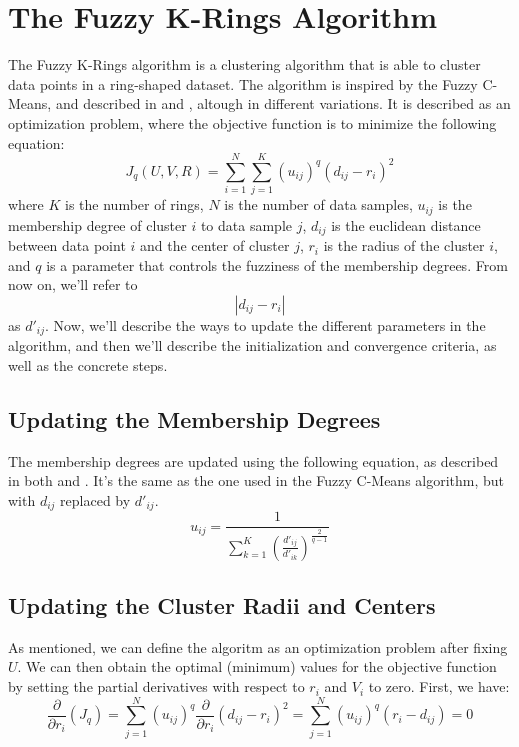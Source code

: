 \documentclass[conference]{IEEEtran}
\begin{document}
\section{The Fuzzy K-Rings Algorithm}
The Fuzzy K-Rings algorithm is a clustering algorithm that is able to cluster data points in a ring-shaped dataset.
The algorithm is inspired by the Fuzzy C-Means, and described in \cite{DAVE1992713} and \cite{308484}, altough in different variations.
It is described as an optimization problem, where the objective function is to minimize the following equation:
\begin{equation}\label{eq:objective}
J_q(U, V, R) = \sum_{i=1}^{N} \sum_{j=1}^{K} (u_{ij})^q (d_{ij} - r_i)^2
\end{equation}
where $K$ is the number of rings, $N$ is the number of data samples, $u_{ij}$ is the membership degree of cluster $i$ to data sample $j$, $d_{ij}$ is the euclidean distance between data point $i$ and the center of cluster $j$, $r_i$ is the radius of the cluster $i$, and $q$ is a parameter that controls the fuzziness of the membership degrees.
From now on, we'll refer to $$|d_{ij} - r_i|$$ as $d'_{ij}$.
Now, we'll describe the ways to update the different parameters in the algorithm, and then we'll describe the initialization and convergence criteria, as well as the concrete steps.

\subsection{Updating the Membership Degrees}
The membership degrees are updated using the following equation, as described in both \cite{DAVE1992713} and \cite{308484}. It's the same as the one used in the Fuzzy C-Means algorithm, but with $d_{ij}$ replaced by $d'_{ij}$.
\begin{equation}
u_{ij} = \frac{1}{\sum_{k=1}^{K} \left(\frac{d'_{ij}}{d'_{ik}}\right)^{\frac{2}{q-1}}}
\end{equation}

\subsection{Updating the Cluster Radii and Centers}
As mentioned, we can define the algoritm as an optimization problem after fixing $U$. We can then obtain the optimal (minimum) values for the objective function
by setting the partial derivatives with respect to $r_i$ and $V_i$ to zero.
First, we have:
\begin{equation}\label{eq:d_dr}
\frac{\partial}{\partial r_i}(J_q) = \sum_{j=1}^{N} (u_{ij})^q\frac{\partial}{\partial r_i} (d_{ij} - r_i)^2 = \sum_{j=1}^{N} (u_{ij})^q (r_i - d_{ij}) = 0
\end{equation}
\end{document}
